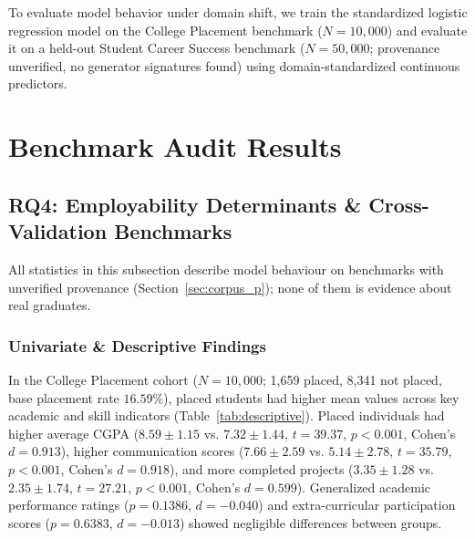\documentclass[journal]{IEEEtran}
\begin{document}
To evaluate model behavior under domain shift, we train the standardized logistic regression model on the College Placement benchmark ($N = 10,000$) and evaluate it on a held-out Student Career Success benchmark ($N = 50,000$; provenance unverified, no generator signatures found) using domain-standardized continuous predictors.

\section{Benchmark Audit Results}
\label{sec:results_p}

\subsection{RQ4: Employability Determinants \& Cross-Validation Benchmarks}

All statistics in this subsection describe model behaviour on benchmarks with unverified provenance (Section~\ref{sec:corpus_p}); none of them is evidence about real graduates.

\subsubsection{Univariate \& Descriptive Findings}
In the College Placement cohort ($N = 10,000$; 1,659 placed, 8,341 not placed, base placement rate $16.59\%$), placed students had higher mean values across key academic and skill indicators (Table~\ref{tab:descriptive}). Placed individuals had higher average CGPA ($8.59 \pm 1.15$ vs. $7.32 \pm 1.44$, $t = 39.37$, $p < 0.001$, Cohen's $d = 0.913$), higher communication scores ($7.66 \pm 2.59$ vs. $5.14 \pm 2.78$, $t = 35.79$, $p < 0.001$, Cohen's $d = 0.918$), and more completed projects ($3.35 \pm 1.28$ vs. $2.35 \pm 1.74$, $t = 27.21$, $p < 0.001$, Cohen's $d = 0.599$). Generalized academic performance ratings ($p = 0.1386$, $d = -0.040$) and extra-curricular participation scores ($p = 0.6383$, $d = -0.013$) showed negligible differences between groups.

\begin{table}[!htbp]
\centering
\caption{Descriptive Statistics: Placed vs. Non-Placed Cohort ($N = 10,000$)}
\label{tab:descriptive}
\resizebox{\columnwidth}{!}{%

}
\end{table}
\end{document}
